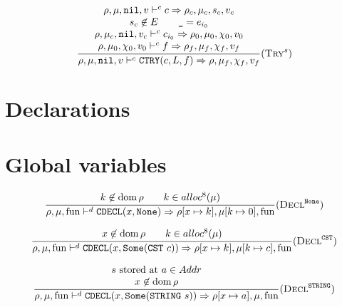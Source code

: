 \[\dfrac{\begin{array}{c}
    \rho,\mu,\texttt{nil},v \vdash^c c \Rightarrow \rho_c,\mu_c,s_c,v_c \\
    s_c \not\in E \qquad \texttt{\_} = e_{i_0} \\
    \rho,\mu_c,\texttt{nil},v_c \vdash^c c_{i_0} \Rightarrow \rho_0,\mu_0,\chi_0,v_0 \\
    \rho,\mu_0,\chi_0,v_0 \vdash^c f \Rightarrow \rho_f,\mu_f,\chi_f,v_f
\end{array}}{\rho,\mu,\texttt{nil},v \vdash^c \texttt{CTRY}(c, L, f) \Rightarrow \rho,\mu_f,\chi_f,v_f} (\textsc{Try}^s)\]

\section{Declarations}
\section{Global variables}

\[\dfrac{\begin{array}{c}
    k\not\in\operatorname{dom}\rho \qquad k \in alloc^8(\mu)
\end{array}}{\rho,\mu,\text{fun} \vdash^d \texttt{CDECL}(x, \texttt{None}) \Rightarrow \rho[x\mapsto k],\mu[k\mapsto 0],\text{fun}} (\textsc{Decl}^{\texttt{None}})\]

\[\dfrac{\begin{array}{c}
    x\not\in\operatorname{dom}\rho \qquad k \in alloc^8(\mu)
\end{array}}{\rho,\mu,\text{fun} \vdash^d \texttt{CDECL}(x, \texttt{Some}(\texttt{CST}\ c)) \Rightarrow \rho[x\mapsto k],\mu[k\mapsto c],\text{fun}} (\textsc{Decl}^{\texttt{CST}})\]

\[\dfrac{\begin{array}{c}
    s\text{ stored at }a\in Addr \\
    x\not\in\dom\rho \\
\end{array}}{\rho,\mu,\fun \gives^d \t{CDECL}(x, \t{Some}(\t{STRING}\ s)) \tto \rho[x\mapsto a],\mu,\fun} \rule{Decl}{^\t{STRING}}\]

